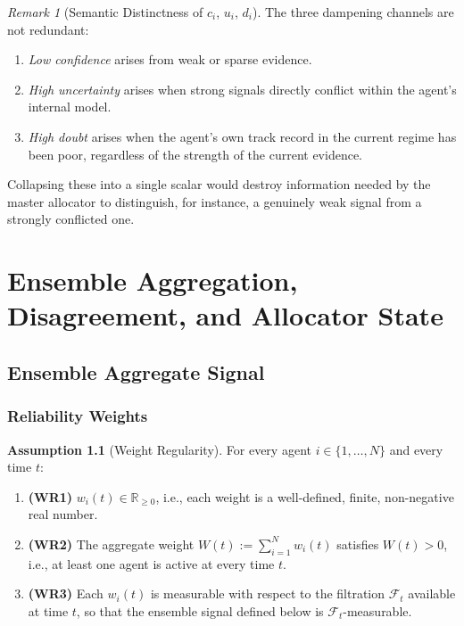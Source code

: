 \documentclass[12pt,openany]{book}
\numberwithin{equation}{chapter}
\theoremstyle{plain}
\theoremstyle{definition}
\newtheorem{assumption}[theorem]{Assumption}
\theoremstyle{remark}
\newtheorem{remark}[theorem]{Remark}
\numberwithin{equation}{chapter}
\theoremstyle{plain}
\begin{document}
\begin{remark}[Semantic Distinctness of $c_i$, $u_i$, $d_i$]
\label{rem:channel-semantic}
The three dampening channels are not redundant:
\begin{enumerate}
  \item \emph{Low confidence} arises from weak or sparse evidence.
  \item \emph{High uncertainty} arises when strong signals directly
        conflict within the agent's internal model.
  \item \emph{High doubt} arises when the agent's own track record
        in the current regime has been poor, regardless of the
        strength of the current evidence.
\end{enumerate}
Collapsing these into a single scalar would destroy information
needed by the master allocator to distinguish, for instance, a
genuinely weak signal from a strongly conflicted one.
\end{remark}

\chapter{Ensemble Aggregation, Disagreement, and Allocator State}
\label{ch:aggregation}

\section{Ensemble Aggregate Signal}

\subsection{Reliability Weights}

\begin{assumption}[Weight Regularity]
\label{asm:weight-regularity}
\label{asm:weights}
For every agent $i \in \{1,\ldots,N\}$ and every time $t$:
\begin{enumerate}
  \item \textbf{(WR1)} $w_i(t) \in \mathbb{R}_{\geq 0}$,
        i.e., each weight is a well-defined, finite, non-negative
        real number.
  \item \textbf{(WR2)} The aggregate weight
        $W(t) := \sum_{i=1}^{N} w_i(t)$ satisfies $W(t) > 0$,
        i.e., at least one agent is active at every time $t$.
  \item \textbf{(WR3)} Each $w_i(t)$ is measurable with respect to
        the filtration $\mathcal{F}_t$ available at time $t$, so that
        the ensemble signal defined below is $\mathcal{F}_t$-measurable.
\end{enumerate}
\end{assumption}
\end{document}
